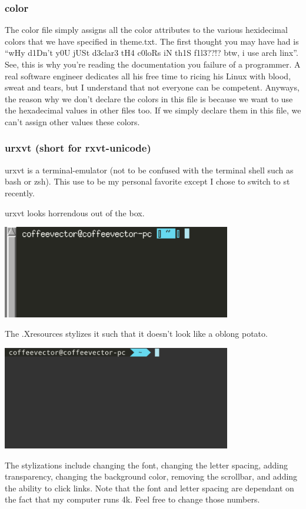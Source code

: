 \documentclass[letterpaper,12pt]{article}
\begin{document}
\subsubsection{color}
\par The color file simply assigns all the color attributes to the various hexidecimal colors that we have specified in theme.txt.
The first thought you may have had is ``wHy d1Dn't y0U jUSt d3clar3 tH4 c0loRs iN th1S f1l3??!? btw, i use arch linx''.
See, this is why you're reading the documentation you failure of a programmer.
A real software engineer dedicates all his free time to ricing his Linux with blood, sweat and tears, but I understand that not everyone can be competent.
Anyways, the reason why we don't declare the colors in this file is because we want to use the hexadecimal values in other files too.
If we simply declare them in this file, we can't assign other values these colors.
\subsubsection{urxvt (short for rxvt-unicode)}
\par urxvt is a terminal-emulator (not to be confused with the terminal shell such as bash or zsh).
This use to be my personal favorite except I chose to switch to st recently.
\par urxvt looks horrendous out of the box.
\begin{center}
	\includegraphics[width=10cm]{./images/urxvtPreXresources.png}
\end{center}
The .Xresources stylizes it such that it doesn't look like a oblong potato.
\begin{center}
	\includegraphics[width=10cm]{./images/urxvtPostXresources.png}
\end{center}
The stylizations include changing the font, changing the letter spacing, adding transparency, changing the background color, removing the scrollbar, and adding the ability to click links.
Note that the font and letter spacing are dependant on the fact that my computer runs 4k.
Feel free to change those numbers.
\end{document}
